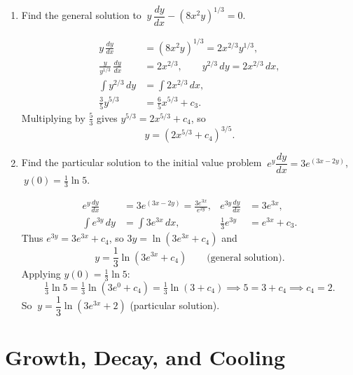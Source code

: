 \documentclass[10pt]{article}
\begin{document}
\begin{enumerate}[leftmargin=*, label=\numbox{\arabic*}]
\item
    \begin{problem}[6cm]
        Find the general solution to \(\ y\,\dfrac{dy}{dx} - \left(8x^2 y\right)^{1/3} = 0\).
    \end{problem}
    \begin{solution}
        \[
        \begin{aligned}
            y\,\frac{dy}{dx} &= (8x^2 y)^{1/3} = 2x^{2/3} y^{1/3}, \\
            \frac{y}{y^{1/3}}\,\frac{dy}{dx} &= 2x^{2/3},
            \qquad y^{2/3}\,dy = 2x^{2/3}\,dx, \\
            \int y^{2/3}\,dy &= \int 2x^{2/3}\,dx, \\
            \frac{3}{5}y^{5/3} &= \frac{6}{5}x^{5/3} + c_3.
        \end{aligned}
        \]
        Multiplying by \(\tfrac{5}{3}\) gives \(y^{5/3} = 2x^{5/3} + c_4\), so
        \[
            y = \left(2x^{5/3} + c_4\right)^{3/5}.
        \]
    \end{solution}

\item
    \begin{problem}[6cm]
        Find the particular solution to the initial value problem
        \(\ e^{y}\dfrac{dy}{dx} = 3 e^{(3x - 2y)}\), \(\ y(0) = \tfrac{1}{3}\ln 5\).
    \end{problem}
    \begin{solution}
        \[
        \begin{aligned}
            e^{y}\frac{dy}{dx} &= 3 e^{(3x - 2y)} = \frac{3 e^{3x}}{e^{2y}}, &
            e^{3y}\frac{dy}{dx} &= 3 e^{3x}, \\
            \int e^{3y}\,dy &= \int 3 e^{3x}\,dx, &
            \frac{1}{3}e^{3y} &= e^{3x} + c_3.
        \end{aligned}
        \]
        Thus \(e^{3y} = 3 e^{3x} + c_4\), so \(3y = \ln(3 e^{3x} + c_4)\) and
        \[
            y = \frac{1}{3}\ln(3 e^{3x} + c_4) \qquad\text{(general solution).}
        \]
        Applying \(y(0) = \tfrac{1}{3}\ln 5\):
        \[
            \tfrac{1}{3}\ln 5 = \tfrac{1}{3}\ln(3 e^0 + c_4) = \tfrac{1}{3}\ln(3 + c_4)
            \implies 5 = 3 + c_4 \implies c_4 = 2.
        \]
        So \(\ y = \dfrac{1}{3}\ln(3 e^{3x} + 2)\) (particular solution).
    \end{solution}

\end{enumerate}

\section{Growth, Decay, and Cooling}
\end{document}
